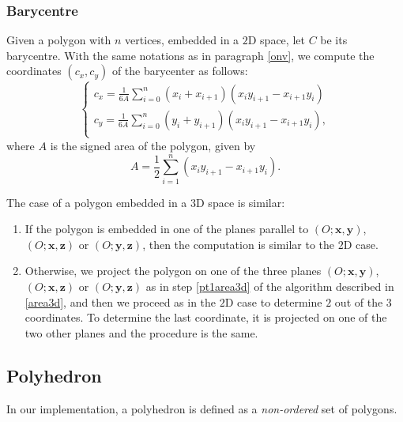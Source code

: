 \subsubsection{Barycentre}
Given a polygon with $n$ vertices, embedded in a $2$D space, let $C$ be its barycentre. With the same notations as in paragraph \ref{onv}, we compute the coordinates $(c_x,c_y)$ of the barycenter as follows:
$$
\begin{cases}
c_x=\frac{1}{6A}\sum_{i=0}^{n} (x_i+x_{i+1})(x_iy_{i+1}-x_{i+1}y_i) \\
c_y=\frac{1}{6A}\sum_{i=0}^{n} (y_i+y_{i+1})(x_iy_{i+1}-x_{i+1}y_i), \\
\end{cases}
$$
where $A$ is the signed area of the polygon, given by
$$A=\frac{1}{2} \sum_{i=1}^n (x_iy_{i+1}-x_{i+1}y_i). $$

\noindent The case of a polygon embedded in a $3$D space is similar:
\begin{enumerate}
\item If the polygon is embedded in one of the planes parallel to $(O;\mathbf{x},\mathbf{y})$, $(O;\mathbf{x},\mathbf{z})$ or $(O;\mathbf{y},\mathbf{z})$, then the computation is similar to the $2$D case. 
\item Otherwise, we project the polygon on one of the three planes $(O;\mathbf{x},\mathbf{y})$, $(O;\mathbf{x},\mathbf{z})$ or $(O;\mathbf{y},\mathbf{z})$ as in step \ref{pt1area3d} of the algorithm described in \ref{area3d}, and then we proceed as in the $2$D case to determine $2$ out of the $3$ coordinates. To determine the last coordinate, it is projected on one of the two other planes and the procedure is the same. 
\end{enumerate}

\subsection{Polyhedron}
In our implementation, a polyhedron is defined as a \textit{non-ordered} set of polygons. 